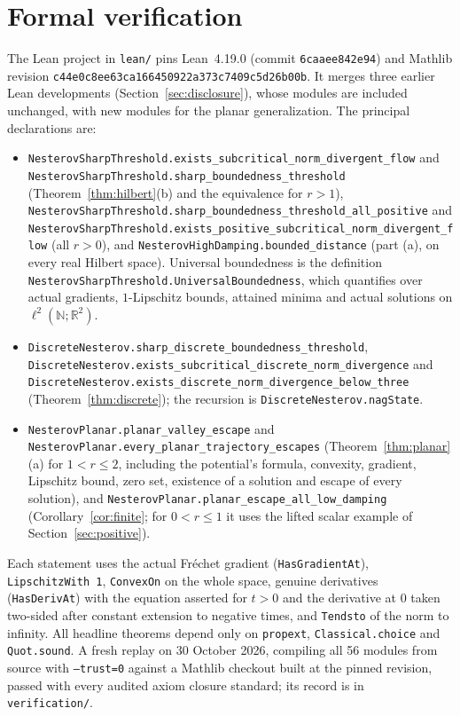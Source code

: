 \documentclass[11pt]{article}
\numberwithin{equation}{section}
\theoremstyle{definition}
\theoremstyle{remark}
\newcommand{\R}{\mathbb R}
\newcommand{\N}{\mathbb N}
\newcommand{\lean}[1]{{\urlstyle{tt}\nolinkurl{#1}}}
\newcommand{\replaystatus}{A fresh replay on 30 October 2026, compiling all 56 modules from source with \texttt{--trust=0} against a Mathlib checkout built at the pinned revision, passed with every audited axiom closure standard; its record is in \texttt{verification/}.}
\begin{document}
\section{Formal verification}\label{sec:formal}
The Lean project in \texttt{lean/} pins Lean~4.19.0 (commit \texttt{6caaee842e94}) and Mathlib revision \texttt{c44e0c8ee63ca166450922a373c7409c5d26b00b}. It merges three earlier Lean developments (Section~\ref{sec:disclosure}), whose modules are included unchanged, with new modules for the planar generalization. The principal declarations are:
{\sloppy
\begin{itemize}[leftmargin=1.5em]
\item \lean{NesterovSharpThreshold.exists_subcritical_norm_divergent_flow} and \lean{NesterovSharpThreshold.sharp_boundedness_threshold} (Theorem~\ref{thm:hilbert}(b) and the equivalence for $r>1$), \lean{NesterovSharpThreshold.sharp_boundedness_threshold_all_positive} and \lean{NesterovSharpThreshold.exists_positive_subcritical_norm_divergent_flow} (all $r>0$), and \lean{NesterovHighDamping.bounded_distance} (part (a), on every real Hilbert space). Universal boundedness is the definition \lean{NesterovSharpThreshold.UniversalBoundedness}, which quantifies over actual gradients, $1$-Lipschitz bounds, attained minima and actual solutions on $\ell^2(\N;\R^2)$.
\item \lean{DiscreteNesterov.sharp_discrete_boundedness_threshold}, \lean{DiscreteNesterov.exists_subcritical_discrete_norm_divergence} and \lean{DiscreteNesterov.exists_discrete_norm_divergence_below_three} (Theorem~\ref{thm:discrete}); the recursion is \lean{DiscreteNesterov.nagState}.
\item \lean{NesterovPlanar.planar_valley_escape} and \lean{NesterovPlanar.every_planar_trajectory_escapes} (Theorem~\ref{thm:planar}(a) for $1<r\le2$, including the potential's formula, convexity, gradient, Lipschitz bound, zero set, existence of a solution and escape of every solution), and \lean{NesterovPlanar.planar_escape_all_low_damping} (Corollary~\ref{cor:finite}; for $0<r\le1$ it uses the lifted scalar example of Section~\ref{sec:positive}).
\end{itemize}
}
Each statement uses the actual Fr\'echet gradient (\texttt{HasGradientAt}), \texttt{LipschitzWith 1}, \texttt{ConvexOn} on the whole space, genuine derivatives (\texttt{HasDerivAt}) with the equation asserted for $t>0$ and the derivative at $0$ taken two-sided after constant extension to negative times, and \texttt{Tendsto} of the norm to infinity. All headline theorems depend only on \texttt{propext}, \texttt{Classical.choice} and \texttt{Quot.sound}. \replaystatus{}
\end{document}
